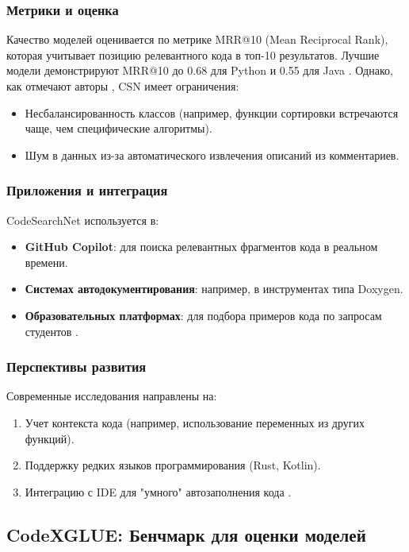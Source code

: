 \documentclass[14pt]{article}
\theoremstyle{definition}
\begin{document}
\subsubsection{Метрики и оценка}
Качество моделей оценивается по метрике MRR@10 (Mean Reciprocal Rank), которая учитывает позицию релевантного кода в топ-10 результатов. Лучшие модели демонстрируют MRR@10 до 0.68 для Python и 0.55 для Java \cite{lu2021codexglue}. Однако, как отмечают авторы \cite{allamanis2019adverse}, CSN имеет ограничения: 
\begin{itemize}
    \item Несбалансированность классов (например, функции сортировки встречаются чаще, чем специфические алгоритмы).
    \item Шум в данных из-за автоматического извлечения описаний из комментариев.
\end{itemize}

\subsubsection{Приложения и интеграция}
CodeSearchNet используется в:
\begin{itemize}
    \item \textbf{GitHub Copilot}: для поиска релевантных фрагментов кода в реальном времени.
    \item \textbf{Системах автодокументирования}: например, в инструментах типа Doxygen.
    \item \textbf{Образовательных платформах}: для подбора примеров кода по запросам студентов \cite{zhang2020retrieval}.
\end{itemize}

\subsubsection{Перспективы развития}
Современные исследования направлены на:
\begin{enumerate}
    \item Учет контекста кода (например, использование переменных из других функций).
    \item Поддержку редких языков программирования (Rust, Kotlin).
    \item Интеграцию с IDE для "умного" автозаполнения кода \cite{austin2021program}.
\end{enumerate}



\newpage
\subsection{CodeXGLUE: Бенчмарк для оценки моделей}
\end{document}
